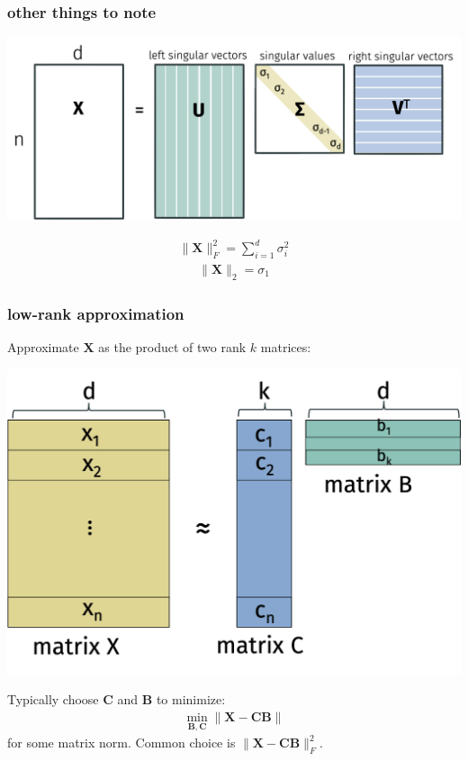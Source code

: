 \documentclass[compress]{beamer}
\newcommand{\bv}[1]{\mathbf{#1}}
\begin{document}
\begin{frame}[t]
	\frametitle{other things to note}
	\begin{center}
		\includegraphics[width=.9\textwidth]{svd.png}
	\end{center} 
	\begin{align*}
		\|\bv{X}\|_F^2 = \sum_{i=1}^d \sigma_i^2
	\end{align*}
	\begin{align*}
		\|\bv{X}\|_2 = \sigma_1
	\end{align*}
\end{frame}

\begin{frame}
	\frametitle{low-rank approximation}
	Approximate $\bv{X}$ as the product of two rank $k$ matrices:
	\vspace{-1em}
	\begin{center}
		\includegraphics[width=.7\textwidth]{low-rank-basic.png}
	\end{center}
	\vspace{-.5em}
Typically choose $\bv{C}$ and $\bv{B}$ to minimize: 
\begin{align*}
	\min_{\bv{B},\bv{C}} \|\bv{X} - \bv{C}\bv{B}\|
\end{align*}
for some matrix norm. Common choice is $\|\bv{X} - \bv{C}\bv{B}\|_F^2$.
\end{frame}
\end{document}
